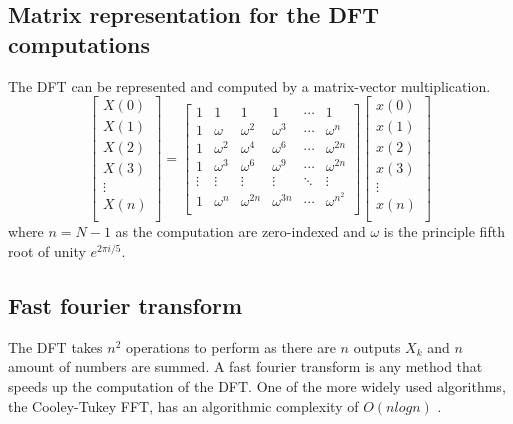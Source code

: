 \subsection{Matrix representation for the DFT computations} 
The DFT can be represented and computed by a matrix-vector multiplication. 
$$
\begin{bmatrix}
    X(0) \\
    X(1) \\
    X(2) \\
    X(3) \\
    \vdots\\
    X(n) \\
\end{bmatrix}
=
\begin{bmatrix}
    1 & 1 & 1 & 1 & \cdots & 1\\
    1 & \omega & \omega ^2 & \omega ^3 & \cdots & \omega ^n\\
    1 & \omega ^2 & \omega ^4 & \omega ^6 & \cdots & \omega ^{2n}\\
    1 & \omega ^3 & \omega ^6 & \omega ^9 & \cdots & \omega ^{2n}\\
    \vdots & \vdots & \vdots & \vdots & \ddots & \vdots \\
    1 & \omega ^{n} & \omega ^{2n} & \omega ^{3n} & \cdots & \omega ^{{n^2}}\\
\end{bmatrix}
\begin{bmatrix}
    x(0) \\
    x(1) \\
    x(2) \\
    x(3) \\
    \vdots\\
    x(n) \\
\end{bmatrix}
$$
where $n = N-1$ as the computation are zero-indexed and $\omega$ is the principle fifth root of unity $e^{2\pi i/5} $. 

\subsection{Fast fourier transform}
The DFT takes $n^2$ operations to perform as there are $n$ outputs $X_k$ and $n$ amount of numbers are summed. A fast fourier transform is any method that speeds up the computation of the DFT. One of the more widely used algorithms, the Cooley-Tukey FFT, has an algorithmic complexity of $O(n log n)$ \cite{Randhawa2018}.

